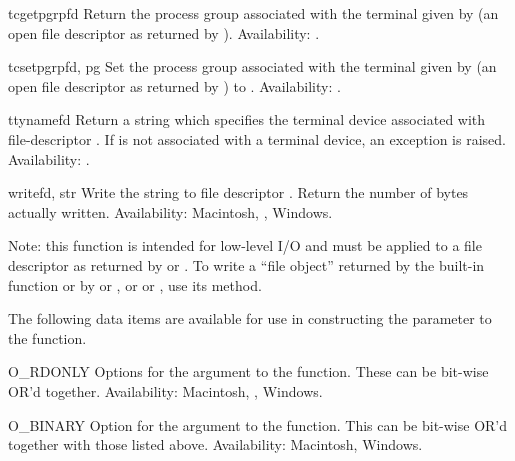 \begin{funcdesc}{tcgetpgrp}{fd}
Return the process group associated with the terminal given by
 (an open file descriptor as returned by ).
Availability: \UNIX.
\end{funcdesc}

\begin{funcdesc}{tcsetpgrp}{fd, pg}
Set the process group associated with the terminal given by
 (an open file descriptor as returned by )
to .
Availability: \UNIX.
\end{funcdesc}

\begin{funcdesc}{ttyname}{fd}
Return a string which specifies the terminal device associated with
file-descriptor .  If  is not associated with a terminal
device, an exception is raised.
Availability: \UNIX.
\end{funcdesc}

\begin{funcdesc}{write}{fd, str}
Write the string  to file descriptor .
Return the number of bytes actually written.
Availability: Macintosh, \UNIX, Windows.

Note: this function is intended for low-level I/O and must be applied
to a file descriptor as returned by  or
.  To write a ``file object'' returned by the
built-in function  or by  or
, or  or , use
its  method.
\end{funcdesc}


The following data items are available for use in constructing the
 parameter to the  function.

\begin{datadesc}{O_RDONLY}
Options for the  argument to the  function.
These can be bit-wise OR'd together.
Availability: Macintosh, \UNIX, Windows.
\end{datadesc}

\begin{datadesc}{O_BINARY}
Option for the  argument to the  function.
This can be bit-wise OR'd together with those listed above.
Availability: Macintosh, Windows.
\end{datadesc}

